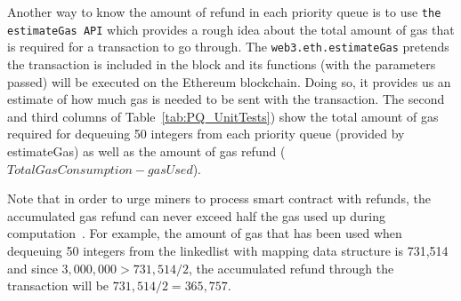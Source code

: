 Another way to know the amount of refund in each priority queue is to use \texttt{the estimateGas API} which provides a rough idea about the total amount of gas that is required for a transaction to go through. The \texttt{web3.eth.estimateGas} pretends the transaction is included in the block  and its functions (with the parameters passed) will be executed on the Ethereum blockchain. Doing so, it provides us an estimate of how much gas is needed to be sent with the transaction. The second and third columns of Table~\ref{tab:PQ_UnitTests}) show the total amount of gas required for dequeuing 50 integers from each priority queue (provided by estimateGas) as well as the amount of gas refund ($Total Gas Consumption - gasUsed$). 

Note that in order to urge miners to process smart contract with refunds, the accumulated gas refund can never exceed half the gas used up during computation~\cite{wood2014ethereum}. For example, the amount of gas that has been used when dequeuing 50 integers from the linkedlist with mapping data structure is 731,514 and since $3,000,000 > 731,514/2$, the accumulated refund through the transaction will be $731,514/2 = 365,757$.


